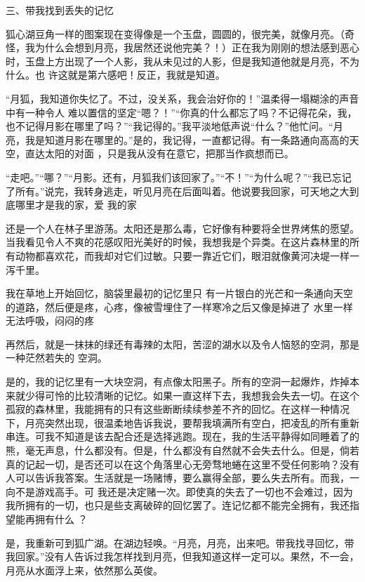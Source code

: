 \documentclass{article}
\begin{document}
三、带我找到丢失的记忆 

狐心湖豆角一样的图案现在变得像是一个玉盘，圆圆的，很完美，就像月亮。（奇怪，我为什么会想到月亮，我居然还说他完美？！）正在我为刚刚的想法感到恶心时，玉盘上方出现了一个人影，我从未见过的人影，但是我知道他就是月亮，不为什么。也
许这就是第六感吧！反正，我就是知道。 

“月狐，我知道你失忆了。不过，没关系，我会治好你的！”温柔得一塌糊涂的声音中有一种令人
\newpage
难以置信的坚定“嗯？！”“你真的什么都忘了吗？不记得花朵，我，也不记得月影在哪里了吗？”“我记得的。”我平淡地低声说“什么？”他忙问。“月亮，我是知道月影在哪里的。”是的，我记得，一直都记得。有一条路通向高高的天空，直达太阳的对面
，只是我从没有在意它，把那当作疯想而已。 

“走吧。”“哪？”“月影。还有，月狐我们该回家了。”“不！”“为什么呢？”“我已忘记了所有。”说完，我转身逃走，听见月亮在后面叫着。他说要我回家，可天地之大到底哪里才是我的家，爱
我的家 

还是一个人在林子里游荡。太阳还是那么毒，它好像有种要将全世界烤焦的愿望。当我看见令人不爽的花感叹阳光美好的时候，我想我是个异类。在这片森林里的所有动物都喜欢花，而我却对它们过敏。只要一靠近它们，眼泪就像黄河决堤一样一泻千里。
 

我在草地上开始回忆，脑袋里最初的记忆里只
\newpage
有一片银白的光芒和一条通向天空的道路，然后便是疼，心疼，像被雪埋住了一样寒冷之后又像是掉进了
水里一样无法呼吸，闷闷的疼 

再然后，就是一抹抹的绿还有毒辣的太阳，苦涩的湖水以及令人恼怒的空洞，那是一种茫然若失的
空洞。 

是的，我的记忆里有一大块空洞，有点像太阳黑子。所有的空洞一起爆炸，炸掉本来就少得可怜的比较清晰的记忆。如果一直这样下去，我想我会失去一切。在这个孤寂的森林里，我能拥有的只有这些断断续续参差不齐的回忆。在这样一种情况下，月亮突然出现，很温柔地告诉我说，要帮我填满所有空白，把凌乱的所有重新串连。可我不知道是该去配合还是选择逃跑。现在，我的生活平静得如同睡着了的熊，毫无声息，什么都没有。但是，什么都没有自然就不会失去什么。但是，倘若真的记起一切，是否还可以在这个角落里心无旁骛地蜷在这里不受任何影响？没有人可以告诉我答案。生活就是一场赌博，要么赢得全部，要么失去所有。而我，一向不是游戏高手。可
\newpage
我还是决定赌一次。即使真的失去了一切也不会难过，因为我所拥有的一切，也只是些支离破碎的回忆罢了。连记忆都不能完全拥有，我还指望能再拥有什么
？ 

是，我重新可到狐广湖。在湖边轻唤。“月亮，月亮，出来吧。带我找寻回忆，带我回家。”没有人告诉过我怎样找到月亮，但我知道这样一定可以。果然，不一会，月亮从水面浮上来，依然那么英俊。
\end{document}
